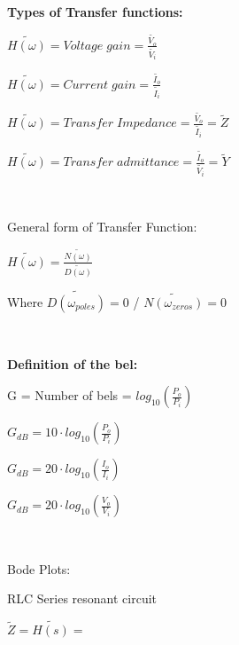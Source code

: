 \documentclass[11pt]{article}
\begin{document}
\bf{Types of Transfer functions:}
\

$\tilde{H(\omega)} =  Voltage \; gain = \frac{\tilde{V_o}}{\tilde{V_i}}$

$\tilde{H(\omega)} =  Current  \; gain = \frac{\tilde{I_o}}{\tilde{I_i}}$

$\tilde{H(\omega)} =  Transfer \; Impedance = \frac{\tilde{V_o}}{\tilde{I_i}} = \tilde{Z}$

$\tilde{H(\omega)} =  Transfer \; admittance = \frac{\tilde{I_o}}{\tilde{V_i}} = \tilde{Y}$

\

General form of Transfer Function:

$\tilde{H(\omega)} = \frac{\tilde{N(\omega)}}{\tilde{D(\omega)}}$

Where $\tilde{D(\omega_{poles})} = 0 $ /
			$\tilde{N(\omega_{zeros})} = 0$ 
			

\

\bf{Definition of the bel:}
\

G = Number of bels = $log_{10}(\frac{P_o}{P_i})$

$G_{dB} =  10 \cdot log_{10}(\frac{P_o}{P_i})$

$G_{dB} = 20 \cdot log_{10}(\frac{I_o}{I_i}) $

$G_{dB} = 20 \cdot log_{10}(\frac{V_o}{V_i}) $

\


Bode Plots:




RLC Series resonant circuit


$\tilde{Z} = \tilde{H(s)} = $
\end{document}
